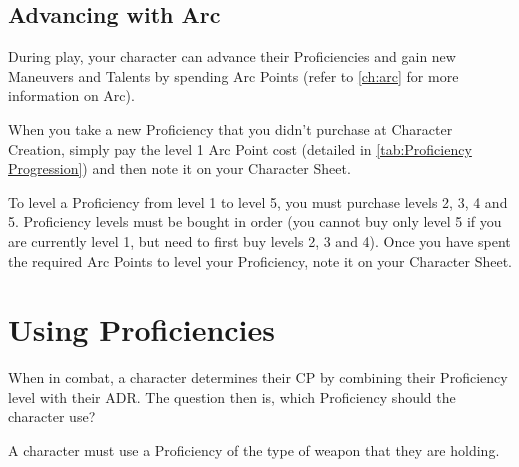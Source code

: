 \documentclass[oneside,11pt,english]{book}
\begin{document}
\subsection{Advancing with Arc}

During play, your character can advance their Proficiencies and gain new Maneuvers and Talents by spending Arc Points (refer to \autoref{ch:arc} for more information on Arc).

When you take a new Proficiency that you didn’t purchase at Character Creation, simply pay the level 1 Arc Point cost (detailed in \autoref{tab:Proficiency Progression}) and then note it on your Character Sheet.

To level a Proficiency from level 1 to level 5, you must purchase levels 2, 3, 4 and 5. Proficiency levels 
must be bought in order (you cannot buy only level 5 if you are currently level 1, but need to first buy 
levels 2, 3 and 4). Once you have spent the required Arc Points to level your Proficiency, note it on your 
Character Sheet. 

\section{Using Proficiencies}
When in combat, a character determines their CP by combining their Proficiency level with their ADR. 
The question then is, which Proficiency should the character use? 

A character must use a Proficiency of the type of weapon that they are holding.  
\end{document}

